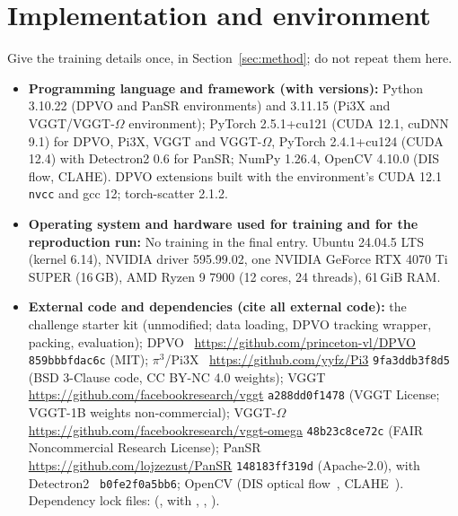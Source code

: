 \documentclass[11pt]{article}
\begin{document}
\section{Implementation and environment}
Give the training details once, in Section~\ref{sec:method}; do not repeat them here.
\begin{itemize}
  \item \textbf{Programming language and framework (with versions):} Python 3.10.22 (DPVO and PanSR environments)
    and 3.11.15 (Pi3X and VGGT/VGGT-$\Omega$ environment); PyTorch 2.5.1+cu121 (CUDA 12.1, cuDNN 9.1) for DPVO, Pi3X,
    VGGT and VGGT-$\Omega$, PyTorch 2.4.1+cu124 (CUDA 12.4) with Detectron2 0.6 for PanSR; NumPy 1.26.4, OpenCV 4.10.0
    (DIS flow, CLAHE). DPVO extensions built with the environment's CUDA 12.1 \texttt{nvcc} and gcc 12; torch-scatter 2.1.2.
  \item \textbf{Operating system and hardware used for training and for the reproduction run:} No training in the final entry. Ubuntu
    24.04.5 LTS (kernel 6.14), NVIDIA driver 595.99.02, one NVIDIA GeForce RTX 4070 Ti SUPER (16\,GB), AMD Ryzen 9
    7900 (12 cores, 24 threads), 61\,GiB RAM.
  \item \textbf{External code and dependencies (cite all external code):}
    the challenge starter kit (unmodified; data loading, DPVO tracking wrapper, packing, evaluation);
    DPVO~\cite{teed2023deep} \url{https://github.com/princeton-vl/DPVO} \texttt{859bbbfdac6c} (MIT);
    $\pi^3$/Pi3X~\cite{wang2025pi3,pi3x2025} \url{https://github.com/yyfz/Pi3} \texttt{9fa3ddb3f8d5} (BSD 3-Clause code,
    CC BY-NC 4.0 weights);
    VGGT~\cite{wang2025vggt} \url{https://github.com/facebookresearch/vggt} \texttt{a288dd0f1478} (VGGT License; VGGT-1B
    weights non-commercial);
    VGGT-$\Omega$~\cite{wang2026vggtomega} \url{https://github.com/facebookresearch/vggt-omega} \texttt{48b23c8ce72c}
    (FAIR Noncommercial Research License);
    PanSR~\cite{zust2026pansr} \url{https://github.com/lojzezust/PanSR} \texttt{148183ff319d} (Apache-2.0), with
    Detectron2~\cite{wu2019detectron2} \texttt{b0fe2f0a5bb6};
    OpenCV (DIS optical flow~\cite{kroeger2016dis}, CLAHE~\cite{zuiderveld1994clahe}).
    Dependency lock files:  (,  with
    , , ).
\end{itemize}
\end{document}
